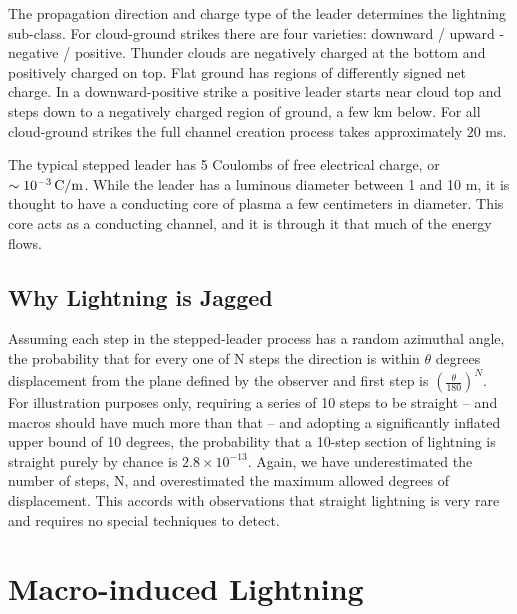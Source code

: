 \documentclass[%
 reprint,
 amsmath,amssymb,
 aps,
]{revtex4-2}
\newcommand{\vtwo}[1]{{\color{red} #1}}
\begin{document}
    The propagation direction and charge type of the leader determines the lightning sub-class. For cloud-ground strikes there are four varieties: downward / upward - negative / positive. Thunder clouds are negatively charged at the bottom and positively charged on top. Flat ground has regions of differently signed net charge. \vtwo{In a downward-positive strike a positive leader starts near cloud top and steps down to a negatively charged region of ground, a few km below.} For all cloud-ground strikes the full channel creation process takes approximately $20$ ms.

    The typical stepped leader has 5 Coulombs of free electrical charge, or $\sim10^{-3} \, \rm{C/m}$. While the leader has a luminous diameter between 1 and 10 m, it is thought to have a conducting core of plasma a few centimeters in diameter. This core acts as a conducting channel, and it is through it that much of the energy flows.
    
    
    \subsection*{Why Lightning is Jagged} %
    \label{sub:why_lightning_is_jagged}

        \vtwo{Assuming each step in the stepped-leader process has a random azimuthal angle, the probability that for every one of N steps the direction is within $\theta$ degrees displacement from the plane defined by the observer and first step is $\left(\frac{\theta}{180}\right)^{N}$. For illustration purposes only, requiring a series of 10 steps to be straight -- and macros should have much more than that -- and adopting a significantly inflated upper bound of 10 degrees, the probability that a 10-step section of lightning is straight purely by chance is $2.8 \times 10^{-13}$. Again, we have underestimated the number of steps, N, and overestimated the maximum allowed degrees of displacement. This accords with observations that straight lightning is very rare and requires no special techniques to detect.}
        



\section{Macro-induced \textbf{}Lightning} %
\label{sec:macro_induced_lightning}
\end{document}
